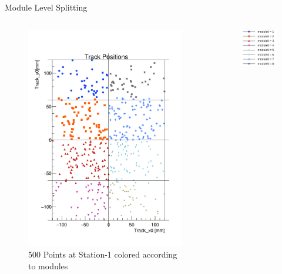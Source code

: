 \begin{frame}{Module Level Splitting}
    \begin{columns}
        \begin{column}{1.2\linewidth}
            \begin{figure}
                \centering
                \includegraphics[height=0.8\textheight]{./ModuleLevelPlots/Positions_st0_truemodule0.pdf}
                \caption{500 Points at Station-1 colored according to modules}
            \end{figure}
        \end{column}
        \begin{column}{0.2\linewidth}
            \begin{figure}
                \hspace{-7cm}\includegraphics[scale=0.25]{./assets/image.png}

\end{figure}
\end{column}
\end{columns}
\end{frame}
